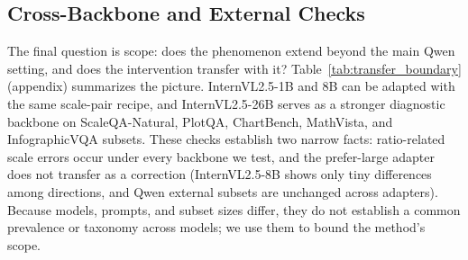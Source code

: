 \subsection{Cross-Backbone and External Checks}

The final question is scope: does the phenomenon extend beyond the main Qwen setting, and does the intervention transfer with it? Table~\ref{tab:transfer_boundary} (appendix) summarizes the picture. InternVL2.5-1B and 8B can be adapted with the same scale-pair recipe, and InternVL2.5-26B serves as a stronger diagnostic backbone on ScaleQA-Natural, PlotQA, ChartBench, MathVista, and InfographicVQA subsets. These checks establish two narrow facts: ratio-related scale errors occur under every backbone we test, and the prefer-large adapter does not transfer as a correction (InternVL2.5-8B shows only tiny differences among directions, and Qwen external subsets are unchanged across adapters). Because models, prompts, and subset sizes differ, they do not establish a common prevalence or taxonomy across models; we use them to bound the method's scope.
